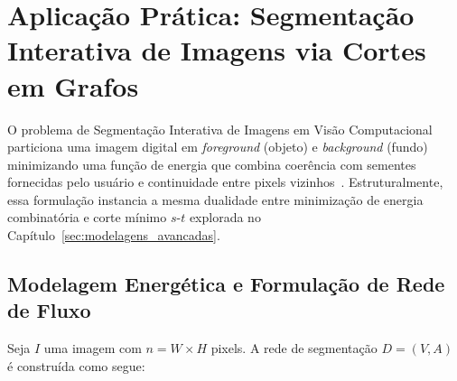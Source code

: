 \chapter{Aplicação Prática: Segmentação Interativa de Imagens via Cortes em Grafos}\label{sec:segmentacao}

O problema de Segmentação Interativa de Imagens em Visão Computacional particiona uma imagem digital em \textit{foreground} (objeto) e \textit{background} (fundo) minimizando uma função de energia que combina coerência com sementes fornecidas pelo usuário e continuidade entre pixels vizinhos~\cite{cook1998combinatorial}. Estruturalmente, essa formulação instancia a mesma dualidade entre minimização de energia combinatória e corte mínimo $s$-$t$ explorada no Capítulo~\ref{sec:modelagens_avancadas}.


\section{Modelagem Energética e Formulação de Rede de Fluxo}

Seja $I$ uma imagem com $n = W \times H$ pixels. A rede de segmentação $D = (V, A)$ é construída como segue:

